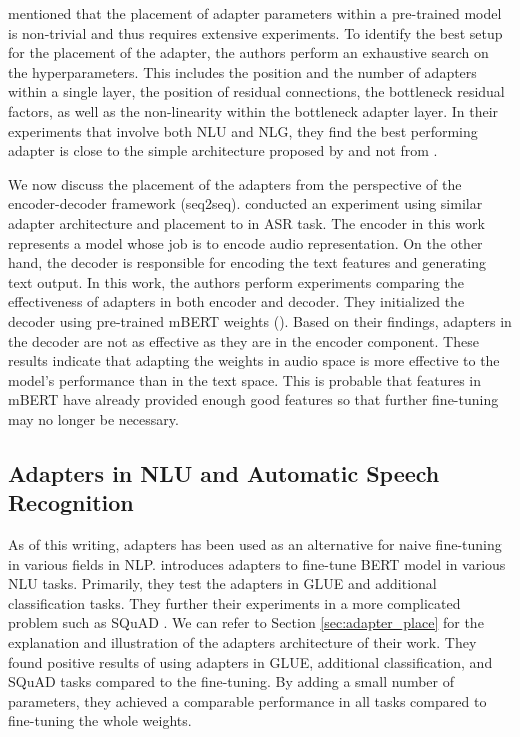 \cite{pfeiffer2021adapterfusion} mentioned that the placement of adapter parameters within a pre-trained model is non-trivial and thus requires extensive experiments. To identify the best setup for the placement of the adapter, the authors perform an exhaustive search on the hyperparameters. This includes the position and the number of adapters within a single layer, the position of residual connections, the bottleneck residual factors, as well as the non-linearity within the bottleneck adapter layer. In their experiments that involve both NLU and NLG, they find the best performing adapter is close to the simple architecture proposed by \cite{bapna2019simple} and not from \cite{houlsby2019parameter}.

We now discuss the placement of the adapters from the perspective of the encoder-decoder framework (seq2seq). \cite{winata2020adapt} conducted an experiment using similar adapter architecture and placement to \cite{bapna2019simple} in ASR task. The encoder in this work represents a model whose job is to encode audio representation. On the other hand, the decoder is responsible for encoding the text features and generating text output. In this work, the authors perform experiments comparing the effectiveness of adapters in both encoder and decoder. They initialized the decoder using pre-trained mBERT weights (\cite{devlin2018bert}). Based on their findings, adapters in the decoder are not as effective as they are in the encoder component. These results indicate that adapting the weights in audio space is more effective to the model's performance than in the text space. This is probable that features in mBERT have already provided enough good features so that further fine-tuning may no longer be necessary.

\subsection{Adapters in NLU and Automatic Speech Recognition}
\label{sec:app_nlu_asr}
As of this writing, adapters has been used as an alternative for naive fine-tuning in various fields in NLP. \cite{houlsby2019parameter} introduces adapters to fine-tune BERT model in various NLU tasks. Primarily, they test the adapters in GLUE \cite{wang2018glue} and additional classification tasks. They further their experiments in a more complicated problem such as SQuAD \cite{rajpurkar2018know}. We can refer to Section \ref{sec:adapter_place} for the explanation and illustration of the adapters architecture of their work. They found positive results of using adapters in GLUE, additional classification, and SQuAD tasks compared to the fine-tuning. By adding a small number of parameters, they achieved a comparable performance in all tasks compared to fine-tuning the whole weights.

